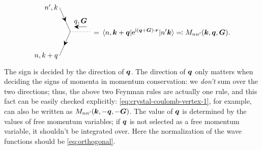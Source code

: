 \documentclass[hyperref, a4paper, 12pt]{report}
\newcommand*{\ii}{\mathrm{i}}
\newcommand*{\ee}{\mathrm{e}}
\begin{document}
\begin{itemize}
\begin{equation}
\begin{gathered}
\begin{tikzpicture}[x=0.75pt,y=0.75pt,yscale=-1,xscale=1]
                \draw    (45.5,27.33) -- (65.5,72.17) ;
                \draw [shift={(57.05,53.22)}, rotate = 245.96] [fill={rgb, 255:red, 0; green, 0; blue, 0 }  ][line width=0.08]  [draw opacity=0] (8.93,-4.29) -- (0,0) -- (8.93,4.29) -- (5.93,0) -- cycle    ;
                \draw    (65.5,72.17) -- (45.5,117) ;
                \draw [shift={(53.95,98.05)}, rotate = 294.04] [fill={rgb, 255:red, 0; green, 0; blue, 0 }  ][line width=0.08]  [draw opacity=0] (8.93,-4.29) -- (0,0) -- (8.93,4.29) -- (5.93,0) -- cycle    ;
                \draw  [dash pattern={on 0.84pt off 2.51pt}]  (65.5,72.17) -- (105.5,72.17) ;
                \draw    (76,63) -- (96.5,63) ;
                \draw [shift={(73,63)}, rotate = 0] [fill={rgb, 255:red, 0; green, 0; blue, 0 }  ][line width=0.08]  [draw opacity=0] (8.93,-4.29) -- (0,0) -- (8.93,4.29) -- (5.93,0) -- cycle    ;
                
                \draw (84.75,60) node [anchor=south] [inner sep=0.75pt]    {$q, \vb*{G}$};
                \draw (43.5,27.33) node [anchor=east] [inner sep=0.75pt]    {$n', k$};
                \draw (43.5,117) node [anchor=east] [inner sep=0.75pt]    {$n, k+q$};
                \end{tikzpicture}                
        \end{gathered} = 
        \mel{n, \vb*{k} + \vb*{q}}{\ee^{\ii (\vb*{q} + \vb*{G}) \cdot \vb*{r}}}{n' \vb*{k}}
        \eqqcolon M_{n n'} (\vb*{k}, \vb*{q}, \vb*{G}) .
    \end{equation}
    The sign is decided by the direction of $\vb*{q}$.
    The direction of $\vb*{q}$ only matters 
    when deciding the signs of momenta in momentum conservation:
    we \emph{don't} sum over the two directions;
    thus, the above two Feynman rules 
    are actually one rule,
    and this fact can be easily checked explicitly:
    \eqref{eq:crystal-coulomb-vertex-1}, for example, 
    can also be written as $M_{nn'}(\vb*{k}, - \vb*{q}, - \vb*{G})$.
    The value of $\vb*{q}$ is determined by the values of free momentum variables;
    if $\vb*{q}$ is not selected as a free momentum variable, 
    it shouldn't be integrated over.
    Here the normalization of the wave functions should be \eqref{eq:orthogonal}.
\end{itemize}
\end{document}
